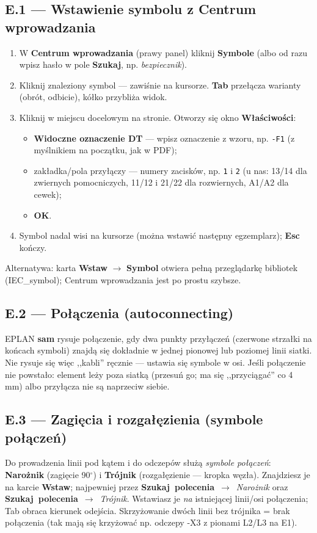 \documentclass[11pt,a4paper]{article}
\newcommand{\ui}[1]{\textbf{#1}}                    %
\newcommand{\szukaj}[1]{\mbox{\ui{Szukaj polecenia} $\to$ \emph{#1}}} %
\begin{document}
\subsection*{E.1 --- Wstawienie symbolu z Centrum wprowadzania}
\begin{enumerate}
\item W \ui{Centrum wprowadzania} (prawy panel) kliknij \ui{Symbole} (albo od razu wpisz hasło
w pole \ui{Szukaj}, np. \emph{bezpiecznik}).
\item Kliknij znaleziony symbol --- zawiśnie na kursorze. \textbf{Tab} przełącza warianty
(obrót, odbicie), kółko przybliża widok.
\item Kliknij w miejscu docelowym na stronie. Otworzy się okno \ui{Właściwości}:
  \begin{itemize}
  \item \ui{Widoczne oznaczenie DT} --- wpisz oznaczenie z wzoru, np. \texttt{-F1}
  (z myślnikiem na początku, jak w PDF);
  \item zakładka/pola przyłączy --- numery zacisków, np. \texttt{1} i \texttt{2}
  (u nas: 13/14 dla zwiernych pomocniczych, 11/12 i 21/22 dla rozwiernych, A1/A2 dla cewek);
  \item \ui{OK}.
  \end{itemize}
\item Symbol nadal wisi na kursorze (można wstawić następny egzemplarz); \textbf{Esc} kończy.
\end{enumerate}
Alternatywa: karta \ui{Wstaw} $\to$ \ui{Symbol} otwiera pełną przeglądarkę bibliotek
(IEC\_symbol); Centrum wprowadzania jest po prostu szybsze.

\subsection*{E.2 --- Połączenia (autoconnecting)}
EPLAN \textbf{sam} rysuje połączenie, gdy dwa punkty przyłączeń (czerwone strzałki na końcach
symboli) znajdą się dokładnie w jednej pionowej lub poziomej linii siatki. Nie rysuje się więc
,,kabli'' ręcznie --- ustawia się symbole w osi. Jeśli połączenie nie powstało: element leży poza
siatką (przesuń go; ma się ,,przyciągać'' co 4 mm) albo przyłącza nie są naprzeciw siebie.

\subsection*{E.3 --- Zagięcia i rozgałęzienia (symbole połączeń)}
Do prowadzenia linii pod kątem i do odczepów służą \emph{symbole połączeń}:
\ui{Narożnik} (zagięcie 90$^\circ$) i \ui{Trójnik} (rozgałęzienie --- kropka węzła).
Znajdziesz je na karcie \ui{Wstaw}; najpewniej przez \szukaj{Narożnik} oraz \szukaj{Trójnik}.
Wstawiasz je \emph{na} istniejącej linii/osi połączenia; Tab obraca kierunek odejścia.
Skrzyżowanie dwóch linii bez trójnika = brak połączenia (tak mają się krzyżować np. odczepy
-X3 z pionami L2/L3 na E1).
\end{document}
